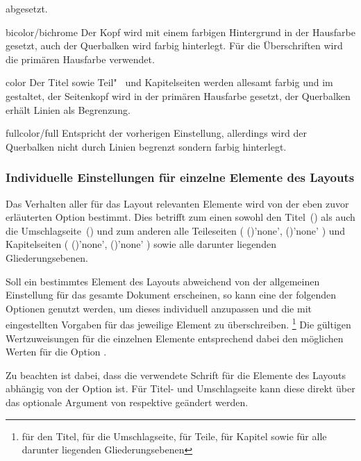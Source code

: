 \begin{Declaration*}{}
\begin{Declaration*}{}
\begin{Declaration*}{}
\begin{Declaration}
\begin{values}{}
  abgesetzt.
\item[bicolor/bichrome]
  Der Kopf wird mit einem farbigen Hintergrund in der Hausfarbe gesetzt, auch 
  der Querbalken wird farbig hinterlegt. Für die Überschriften wird die 
  primären Hausfarbe verwendet.
\item[color]
  Der Titel sowie Teil"~ und Kapitelseiten werden allesamt farbig und im \CD 
  gestaltet, der Seitenkopf wird in der primären Hausfarbe  
  gesetzt, der Querbalken erhält Linien als Begrenzung.
\item[fullcolor/full]
  Entspricht der vorherigen Einstellung, allerdings wird der Querbalken nicht 
  durch Linien begrenzt sondern farbig hinterlegt.
\end{values}
\end{Declaration}


\subsubsection{Individuelle Einstellungen für einzelne Elemente des Layouts}
Das Verhalten aller für das Layout relevanten Elemente wird von der eben zuvor 
erläuterten Option  bestimmt. Dies betrifft zum einen sowohl 
den Titel~() als auch die Umschlagseite~() 
und zum anderen alle Teileseiten
(%
  ()'none', 
  ()'none'%
)
und Kapitelseiten 
(%
  ()'none', 
  ()'none'%
)
sowie alle darunter liegenden Gliederungsebenen.

Soll ein bestimmtes Element des Layouts abweichend von der allgemeinen 
Einstellung für das gesamte Dokument erscheinen, so kann eine der folgenden 
Optionen genutzt werden, um dieses individuell anzupassen und die mit 
 eingestellten Vorgaben für das jeweilige Element zu 
überschreiben.%
\footnote{%
   für den Titel,  für die Umschlagseite,
   für Teile,  für Kapitel sowie
   für alle darunter liegenden Gliederungsebenen%
}
Die gültigen Wertzuweisungen für die einzelnen Elemente entsprechend dabei den 
möglichen Werten für die Option . 

Zu beachten ist dabei, dass die verwendete Schrift für die Elemente des Layouts 
abhängig von der Option  ist. Für Titel- und Umschlagseite 
kann diese direkt über das optionale Argument von  respektive 
 geändert werden.


\end{Declaration*}
\end{Declaration*}
\end{Declaration*}
